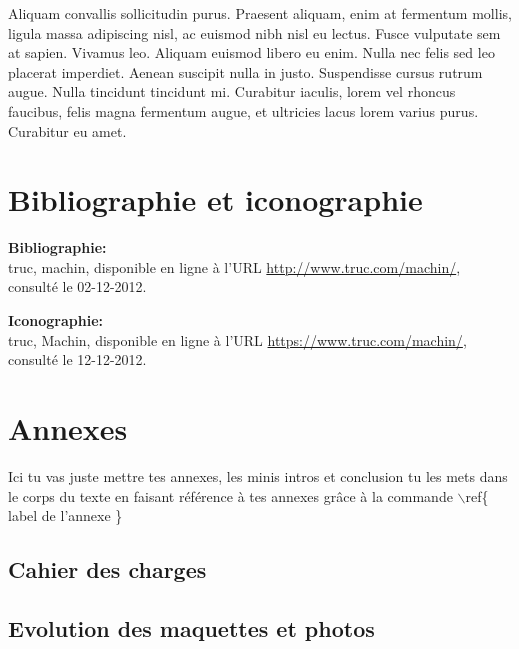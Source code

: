 \documentclass{report}
\begin{document}
Aliquam convallis sollicitudin purus. Praesent aliquam, enim at fermentum mollis, ligula massa adipiscing nisl, ac euismod nibh nisl eu lectus. Fusce vulputate sem at sapien. Vivamus leo. Aliquam euismod libero eu enim. Nulla nec felis sed leo placerat imperdiet. Aenean suscipit nulla in justo. Suspendisse cursus rutrum augue. Nulla tincidunt tincidunt mi. Curabitur iaculis, lorem vel rhoncus faucibus, felis magna fermentum augue, et ultricies lacus lorem varius purus. Curabitur eu amet. 


\chapter*{Bibliographie et iconographie}


\textbf{Bibliographie:}\\

truc, machin, disponible en ligne à
l'URL \url{http://www.truc.com/machin/}, consulté le 02-12-2012.



\newline
\textbf{Iconographie:}\\

 truc, Machin, disponible en ligne à
l'URL \url{https://www.truc.com/machin/}, consulté le 12-12-2012.


\appendix

\chapter*{Annexes}
\renewcommand{\thesection}{A\arabic{section}}

Ici tu vas juste mettre tes annexes, les minis intros et conclusion tu les mets dans le corps du texte en faisant référence à tes annexes grâce à la commande $\backslash$ref\{ label de l'annexe \} %

\section{Cahier des charges} \label{cdc}

\section{Evolution des maquettes et photos}\label{evo}
\end{document}
